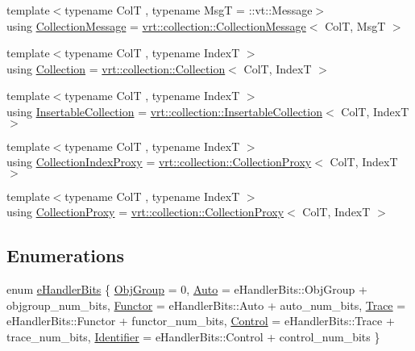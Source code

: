 \begin{DoxyCompactItemize}
\item 
{\footnotesize template$<$typename ColT , typename MsgT  = \+::vt\+::\+Message$>$ }\\using \hyperlink{namespacevt_ae7700e12f79c0fec16964aab84838428}{Collection\+Message} = \hyperlink{structvt_1_1vrt_1_1collection_1_1_collection_message}{vrt\+::collection\+::\+Collection\+Message}$<$ ColT, MsgT $>$
\item 
{\footnotesize template$<$typename ColT , typename IndexT $>$ }\\using \hyperlink{namespacevt_ac72e048964e4bb536faaa8bc90f58db7}{Collection} = \hyperlink{structvt_1_1vrt_1_1collection_1_1_collection}{vrt\+::collection\+::\+Collection}$<$ ColT, IndexT $>$
\item 
{\footnotesize template$<$typename ColT , typename IndexT $>$ }\\using \hyperlink{namespacevt_a7ffafd5682603cf80b1874f83cc7234f}{Insertable\+Collection} = \hyperlink{structvt_1_1vrt_1_1collection_1_1_insertable_collection}{vrt\+::collection\+::\+Insertable\+Collection}$<$ ColT, IndexT $>$
\item 
{\footnotesize template$<$typename ColT , typename IndexT $>$ }\\using \hyperlink{namespacevt_a2be17f5dafb626fe9f58d762b6aad2f0}{Collection\+Index\+Proxy} = \hyperlink{structvt_1_1vrt_1_1collection_1_1_collection_proxy}{vrt\+::collection\+::\+Collection\+Proxy}$<$ ColT, IndexT $>$
\item 
{\footnotesize template$<$typename ColT , typename IndexT $>$ }\\using \hyperlink{namespacevt_a0d58a693bfb96e0ce5d145692a1a1f98}{Collection\+Proxy} = \hyperlink{structvt_1_1vrt_1_1collection_1_1_collection_proxy}{vrt\+::collection\+::\+Collection\+Proxy}$<$ ColT, IndexT $>$
\end{DoxyCompactItemize}
\subsection*{Enumerations}
\begin{DoxyCompactItemize}
\item 
enum \hyperlink{namespacevt_af182285b57b225b163d5d8aff03cb8c2}{e\+Handler\+Bits} \{ \newline
\hyperlink{namespacevt_af182285b57b225b163d5d8aff03cb8c2ad0350d799a68d110696009c434e5b701}{Obj\+Group} = 0, 
\hyperlink{namespacevt_af182285b57b225b163d5d8aff03cb8c2abfa992da505171200949c7e580e84ea2}{Auto} = e\+Handler\+Bits\+:\+:Obj\+Group + objgroup\+\_\+num\+\_\+bits, 
\hyperlink{namespacevt_af182285b57b225b163d5d8aff03cb8c2ac61e9f48e514369f0eb8ac5cebf9fb14}{Functor} = e\+Handler\+Bits\+:\+:Auto + auto\+\_\+num\+\_\+bits, 
\hyperlink{namespacevt_af182285b57b225b163d5d8aff03cb8c2aee391b103987f3eb488e081ecc1fc5e8}{Trace} = e\+Handler\+Bits\+:\+:Functor + functor\+\_\+num\+\_\+bits, 
\newline
\hyperlink{namespacevt_af182285b57b225b163d5d8aff03cb8c2a3e3fe7a58187c2288f3c2177be08d4d5}{Control} = e\+Handler\+Bits\+:\+:Trace + trace\+\_\+num\+\_\+bits, 
\hyperlink{namespacevt_af182285b57b225b163d5d8aff03cb8c2a4f58efa47c6cfd117a011be7820d1d8a}{Identifier} = e\+Handler\+Bits\+:\+:Control + control\+\_\+num\+\_\+bits
 \}
\end{DoxyCompactItemize}
